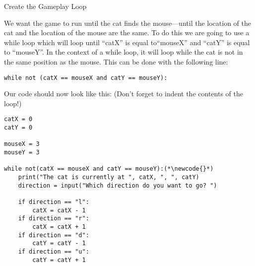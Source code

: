 \documentclass[12pt,oneside]{article}
\newcommand{\q}[1]{``#1''}
\newcommand{\subsectitle}[1]{
  \begin{flushleft}{\large#1}\end{flushleft}
}
\newcommand{\newcode}[0]{\hfill<--}
\begin{document}
\begin{minipage}{\textwidth}
\subsectitle{Create the Gameplay Loop}
We want the game to run until the cat finds the mouse---until the location of the cat and the location of the mouse are the same. To do this we are going to use a while loop which will loop until \q{catX} is equal to\q{mouseX} and \q{catY} is equal to \q{mouseY}. In the context of a while loop, it will loop while the cat is not in the same position as the mouse. This can be done with the following line:

\begin{lstlisting}
while not (catX == mouseX and catY == mouseY):
\end{lstlisting}

Our code should now look like this: (Don't forget to indent the contents of the loop!)

\begin{lstlisting}
catX = 0
catY = 0

mouseX = 3
mouseY = 3

while not(catX == mouseX and catY == mouseY):(*\newcode{}*)
    print("The cat is currently at ", catX, ", ", catY)
    direction = input("Which direction do you want to go? ")
    
    if direction == "l":
        catX = catX - 1
    if direction == "r":
        catX = catX + 1
    if direction == "d":
        catY = catY - 1
    if direction == "u":
        catY = catY + 1
\end{lstlisting}
\end{minipage}
\end{document}
